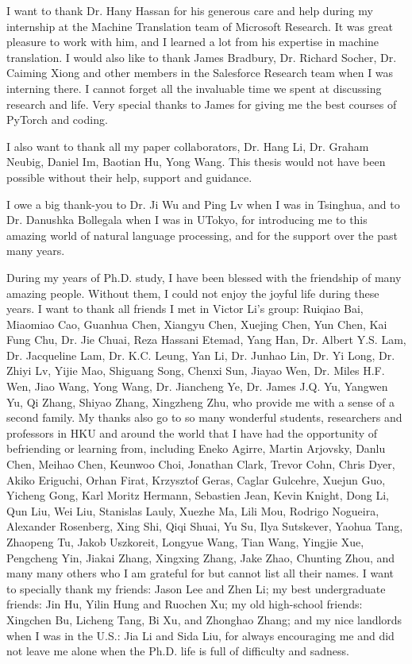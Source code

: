  I want to thank Dr. Hany Hassan for his generous care and help during my internship at the Machine Translation team of Microsoft Research. 
 It was great pleasure to work with him, and I learned a lot from his expertise in machine translation. 
 I would also like to thank James Bradbury, Dr. Richard Socher, Dr. Caiming Xiong and other members in the Salesforce Research team when I was interning there. I cannot forget all the invaluable time we spent at discussing research and life. Very special thanks to James for giving me the best courses of PyTorch and coding.
 
 I also want to thank all my paper collaborators, 
 Dr. Hang Li, 
 Dr. Graham Neubig, 
 Daniel Im,
 Baotian Hu,
 Yong Wang.
 This thesis would not have been possible without their help, support and guidance.
 
I owe a big thank-you to Dr. Ji Wu and Ping Lv when I was in Tsinghua, and to Dr. Danushka Bollegala when I was  in UTokyo, for introducing me to this amazing world of natural language processing, and for the support over the past many years.
 
During my years of Ph.D. study, I have been blessed with the friendship of many amazing people. Without them, I could not enjoy the joyful life during these years.
I want to thank all friends I met in Victor Li's group:
Ruiqiao Bai,
Miaomiao Cao,
Guanhua Chen,
Xiangyu Chen,
Xuejing Chen,
Yun Chen,
Kai Fung Chu,
Dr. Jie Chuai,
Reza Hassani Etemad,
Yang Han,
Dr. Albert Y.S. Lam,
Dr. Jacqueline Lam,
Dr. K.C. Leung,
Yan Li,
Dr. Junhao Lin,
Dr. Yi Long,
Dr. Zhiyi Lv,
Yijie Mao,
Shiguang Song,
Chenxi Sun,
Jiayao Wen,
Dr. Miles H.F. Wen,
Jiao Wang,
Yong Wang,
Dr. Jiancheng Ye,
Dr. James J.Q. Yu,
Yangwen Yu,
Qi Zhang,
Shiyao Zhang,
Xingzheng Zhu,
who provide me with a sense of a second family.
My thanks also go to so many wonderful students, researchers and professors in HKU and around the world that I have had the opportunity of befriending or learning from, including
Eneko Agirre,
Martin Arjovsky,
Danlu Chen,
Meihao Chen,
Keunwoo Choi,
Jonathan Clark,
Trevor Cohn,
Chris Dyer,
Akiko Eriguchi,
Orhan Firat,
Krzysztof Geras,
Caglar Gulcehre,
Xuejun Guo,
Yicheng Gong,
Karl Moritz Hermann,
Sebastien Jean,
Kevin Knight,
Dong Li,
Qun Liu,
Wei Liu,
Stanislas Lauly,
Xuezhe Ma,
Lili Mou,
Rodrigo Nogueira,
Alexander Rosenberg,
Xing Shi,
Qiqi Shuai,
Yu Su,
Ilya Sutskever,
Yaohua Tang,
Zhaopeng Tu,
Jakob Uszkoreit,
Longyue Wang,
Tian Wang,
Yingjie Xue,
Pengcheng Yin,
Jiakai Zhang,
Xingxing Zhang,
Jake Zhao,
Chunting Zhou,
 and many many others who I am grateful for but cannot list all their names. 
I want to specially thank my friends: Jason Lee and Zhen Li;
my best undergraduate friends: Jin Hu,  Yilin Hung and Ruochen Xu;
my old high-school friends: Xingchen Bu,  Licheng Tang, Bi Xu, and  Zhonghao Zhang;
and my nice landlords when I was in the U.S.: Jia Li and Sida Liu,
 for always encouraging me and did not leave me alone when the Ph.D. life is full of difficulty and sadness.


